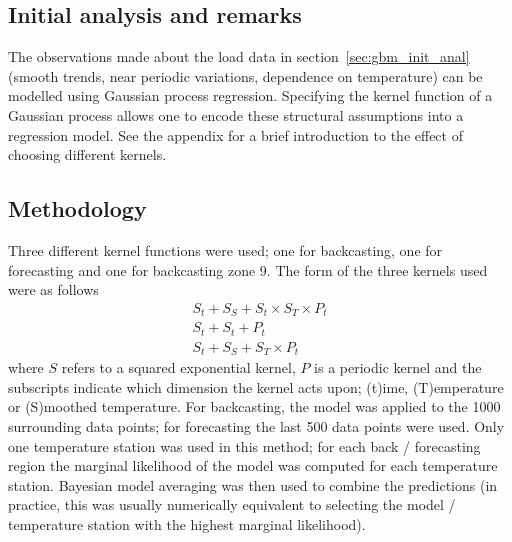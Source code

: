 \documentclass[preprint,authoryear,12pt]{elsarticle}
\begin{document}
\subsection{Initial analysis and remarks}

The observations made about the load data in section~\ref{sec:gbm_init_anal} (\ie smooth trends, near periodic variations, dependence on temperature) can be modelled using Gaussian process regression.
Specifying the kernel function of a Gaussian process allows one to encode these structural assumptions into a regression model.
See the appendix for a brief introduction to the effect of choosing different kernels.

\subsection{Methodology}

Three different kernel functions were used; one for backcasting, one for forecasting and one for backcasting zone 9.
The form of the three kernels used were as follows\footnotemark
{}
\begin{eqnarray}
S_t + S_S + S_t \times S_T \times P_t \label{eqn:kernel1}\\
S_t + S_t + P_t \label{eqn:kernel2}\\
S_t + S_S + S_T \times P_t\label{eqn:kernel3}
\end{eqnarray}
where $S$ refers to a squared exponential kernel, $P$ is a periodic kernel and the subscripts indicate which dimension the kernel acts upon; (t)ime, (T)emperature or (S)moothed temperature.
For backcasting, the model was applied to the 1000 surrounding data points; for forecasting the last 500 data points were used.
Only one temperature station was used in this method; for each back / forecasting region the marginal likelihood of the model was computed for each temperature station.
Bayesian model averaging \citep[e.g.][]{Hoeting1999} was then used to combine the predictions (in practice, this was usually numerically equivalent to selecting the model / temperature station with the highest marginal likelihood).
\end{document}
